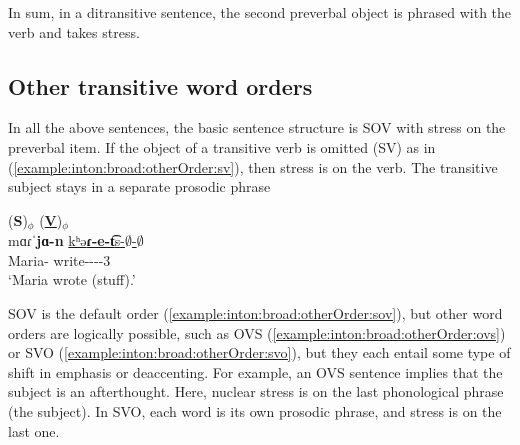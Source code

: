 In sum, in a ditransitive sentence, the second preverbal object is phrased with the verb and takes stress. 


\subsection{Other transitive word orders}\label{section:intonation:broadFocus:otherWordOrder}


In all the above sentences, the basic sentence structure is SOV with stress on the preverbal item. If the object of a transitive verb is omitted (SV) as in (\ref{example:inton:broad:otherOrder:sv}), then stress is on the verb. The transitive subject stays   in a separate prosodic phrase

\begin{exe}
	\ex \glll (\textbf{S})$_\phi$ (\textbf{\underline{V}})$_\phi$ \\
	mɑɾˈ\textbf{jɑ-n} \underline{kʰə\textbf{ɾ-e-t͡}s-$\emptyset$-$\emptyset$} \\
	Maria-{}   write-{\thgloss}-{\aorperf}-{\pst}-3{\sg} \\
	\trans `Maria wrote (stuff).' \label{example:inton:broad:otherOrder:sv}
	\\ 
	
\end{exe}

SOV is the default order (\ref{example:inton:broad:otherOrder:sov}), but other word orders are logically possible, such as OVS  (\ref{example:inton:broad:otherOrder:ovs}) or SVO (\ref{example:inton:broad:otherOrder:svo}), but they each entail some type of shift in emphasis or deaccenting. For example, an OVS sentence implies that the subject is an afterthought. Here, nuclear stress is on the last phonological phrase (the subject). In SVO, each word is its own prosodic phrase, and stress is on the last one. 

